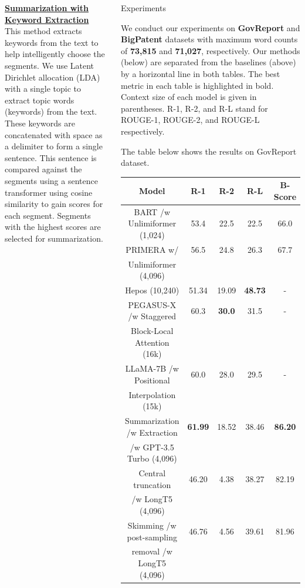 \documentclass[20pt]{beamer}
\newcommand{\heading}[1]{\ul{\textbf{#1}} \\}
\begin{document}
\begin{frame}[t]
\begin{columns}[t]
  \vspace{.8cm}
  \begin{minipage}{\columnwidth}
    \heading{Summarization with Keyword Extraction}
    This method extracts keywords from the text to help intelligently choose the segments.
    We use Latent Dirichlet allocation (LDA) with a single topic to extract topic words (keywords) from the text.
    These keywords are concatenated with space as a delimiter to form a single sentence.
    This sentence is compared against the segments using a sentence transformer using cosine similarity to gain scores for each segment.
    Segments with the highest scores are selected for summarization.
  \end{minipage}
  
  \begin{block}{Experiments}

    We conduct our experiments on \textbf{GovReport} and \textbf{BigPatent} datasets with maximum word counts of \textbf{73,815} and \textbf{71,027}, respectively.
    Our methods (below) are separated from the baselines (above) by a horizontal line in both tables.
    The best metric in each table is highlighted in bold.
    Context size of each model is given in parentheses.
    R-1, R-2, and R-L stand for ROUGE-1, ROUGE-2, and ROUGE-L respectively.

    The table below shows the results on GovReport dataset.

    \begin{table}[!ht]
      \centering
      \small
    
      \begin{tabular}{c c c c c}
        \hline
        Model & R-1 & R-2 & R-L & B-Score \\
        \hline
        BART /w Unlimiformer (1,024) & 53.4 & 22.5 & 22.5 & 66.0 \\
        PRIMERA w/ & 56.5 & 24.8 & 26.3 & 67.7 \\
        Unlimiformer (4,096) & & & & \\
        Hepos (10,240) & 51.34 & 19.09 & \textbf{48.73} & - \\
        PEGASUS-X /w Staggered & 60.3 & \textbf{30.0} & 31.5 & - \\
        Block-Local Attention (16k) & & & & \\
        LLaMA-7B /w Positional & 60.0 & 28.0 & 29.5 & - \\
        Interpolation (15k) & & & & \\
        \hline
        Summarization /w Extraction & \textbf{61.99} & 18.52 & 38.46 & \textbf{86.20} \\
        /w GPT-3.5 Turbo (4,096) & & & & \\
        Central truncation & 46.20 & 4.38 & 38.27 & 82.19 \\
        /w LongT5 (4,096) & & & & \\
        Skimming /w post-sampling & 46.76 & 4.56 & 39.61 & 81.96 \\
        removal /w LongT5 (4,096) & & & & \\
        \hline
      \end{tabular}


\end{table}
\end{block}
\end{columns}
\end{frame}
\end{document}
